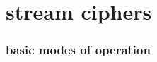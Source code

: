 
\section{stream ciphers}
\begin{frame}
\frametitle{basic modes of operation}
	\begin{center}
	\end{center}
\end{frame}
